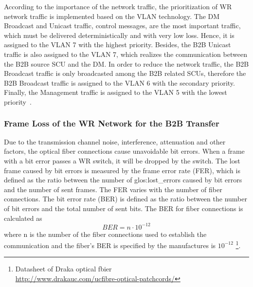 According to the importance of the network traffic, the prioritization of WR network traffic is implemented based on the VLAN technology. The DM Broadcast and Unicast traffic, control messages, are the most important traffic, which must be delivered deterministically and with very low loss. Hence, it is assigned to the VLAN 7 with the highest priority. Besides, the B2B Unicast traffic is also assigned to the VLAN 7, which realizes the communication between the B2B source SCU and the DM. In order to reduce the network traffic, the B2B Broadcast traffic is only broadcasted among the B2B related SCUs, therefore the B2B Broadcast traffic is assigned to the VLAN 6 with the secondary priority. Finally, the Management traffic is assigned to the VLAN 5 with the lowest priority~\cite{prados_testing_2016}.




\subsubsection{Frame Loss of the WR Network for the B2B Transfer} 

Due to the transmission channel noise, interference, attenuation and other factors, the optical fiber connections cause unavoidable bit errors. When a frame with a bit error passes a WR switch, it will be dropped by the switch. The lost frame caused by bit errors is measured by the frame error rate (\gls{FER}), which is defined as the ratio between the number of \gls{glos:lost_error}s caused by bit errors and the number of sent frames. The FER varies with the number of fiber connections. The bit error rate (\gls{BER}) is defined as the ratio between the number of bit errors and the total number of sent bits. The BER for fiber connections is calculated as~\cite{prados_white_2011} 
\begin{equation}
	BER=n\cdot10^{-12}
\end{equation}
where n is the number of the fiber connections used to establish the communication and the fiber's BER is specified by the manufactures is $10^{-12}$ \footnote{Datasheet of Draka optical fbier \\ \url{http://www.drakauc.com/ucfibre-optical-patchcords/}}. 
 
